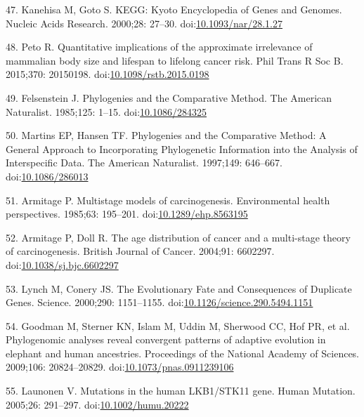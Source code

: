 \documentclass[]{elsarticle} %
\begin{document}
\leavevmode\hypertarget{ref-KEGG}{}%
47. Kanehisa M, Goto S. KEGG: Kyoto Encyclopedia of Genes and Genomes. Nucleic Acids Research. 2000;28: 27--30. doi:\href{https://doi.org/10.1093/nar/28.1.27}{10.1093/nar/28.1.27}

\leavevmode\hypertarget{ref-Peto:20151c2}{}%
48. Peto R. Quantitative implications of the approximate irrelevance of mammalian body size and lifespan to lifelong cancer risk. Phil Trans R Soc B. 2015;370: 20150198. doi:\href{https://doi.org/10.1098/rstb.2015.0198}{10.1098/rstb.2015.0198}

\leavevmode\hypertarget{ref-Felsenstein1985}{}%
49. Felsenstein J. Phylogenies and the Comparative Method. The American Naturalist. 1985;125: 1--15. doi:\href{https://doi.org/10.1086/284325}{10.1086/284325}

\leavevmode\hypertarget{ref-MartinsAndHansen1997}{}%
50. Martins EP, Hansen TF. Phylogenies and the Comparative Method: A General Approach to Incorporating Phylogenetic Information into the Analysis of Interspecific Data. The American Naturalist. 1997;149: 646--667. doi:\href{https://doi.org/10.1086/286013}{10.1086/286013}

\leavevmode\hypertarget{ref-Armitage:19851c2}{}%
51. Armitage P. Multistage models of carcinogenesis. Environmental health perspectives. 1985;63: 195--201. doi:\href{https://doi.org/10.1289/ehp.8563195}{10.1289/ehp.8563195}

\leavevmode\hypertarget{ref-Armitage:20041c2}{}%
52. Armitage P, Doll R. The age distribution of cancer and a multi-stage theory of carcinogenesis. British Journal of Cancer. 2004;91: 6602297. doi:\href{https://doi.org/10.1038/sj.bjc.6602297}{10.1038/sj.bjc.6602297}

\leavevmode\hypertarget{ref-Lynch2000}{}%
53. Lynch M, Conery JS. The Evolutionary Fate and Consequences of Duplicate Genes. Science. 2000;290: 1151--1155. doi:\href{https://doi.org/10.1126/science.290.5494.1151}{10.1126/science.290.5494.1151}

\leavevmode\hypertarget{ref-Goodman2009}{}%
54. Goodman M, Sterner KN, Islam M, Uddin M, Sherwood CC, Hof PR, et al. Phylogenomic analyses reveal convergent patterns of adaptive evolution in elephant and human ancestries. Proceedings of the National Academy of Sciences. 2009;106: 20824--20829. doi:\href{https://doi.org/10.1073/pnas.0911239106}{10.1073/pnas.0911239106}

\leavevmode\hypertarget{ref-Launonen2005}{}%
55. Launonen V. Mutations in the human LKB1/STK11 gene. Human Mutation. 2005;26: 291--297. doi:\href{https://doi.org/10.1002/humu.20222}{10.1002/humu.20222}
\end{document}
